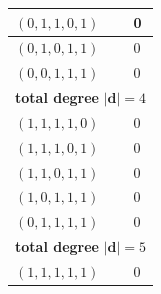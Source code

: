 \documentclass{article}
\newcommand{\bd}{\mathbf{d}}
\begin{document}
\begin{longtable}{|l|l|}
$(0,1,1,0,1)$ & 0 \\ \hline
$(0,1,0,1,1)$ & 0 \\ \hline
$(0,0,1,1,1)$ & 0 \\ \hline
\multicolumn{2}{|l|}{\textbf{total degree }$|\bd|=4$} \\ \hline
$(1,1,1,1,0)$ & 0 \\ \hline
$(1,1,1,0,1)$ & 0 \\ \hline
$(1,1,0,1,1)$ & 0 \\ \hline
$(1,0,1,1,1)$ & 0 \\ \hline
$(0,1,1,1,1)$ & 0 \\ \hline
\multicolumn{2}{|l|}{\textbf{total degree }$|\bd|=5$} \\ \hline
$(1,1,1,1,1)$ & 0 \\ \hline
\end{longtable}
\normalsize


\end{document}
